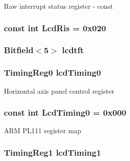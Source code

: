 \label{classPl111_a977905b70318298f359957fea2723d97}
Raw interrupt status register -\/ const \hypertarget{classPl111_a7f3aa652b9a702247d99dee87aee4786}{
\subsubsection[{LcdRis}]{\setlength{\rightskip}{0pt plus 5cm}const int {\bf LcdRis} = 0x020}}
\label{classPl111_a7f3aa652b9a702247d99dee87aee4786}
\hypertarget{classPl111_a5fd2ed83172b7ffc81125a20b85168fe}{
\subsubsection[{lcdtft}]{\setlength{\rightskip}{0pt plus 5cm}Bitfield$<$5$>$ {\bf lcdtft}}}
\label{classPl111_a5fd2ed83172b7ffc81125a20b85168fe}
\hypertarget{classPl111_a913cd36ff92062c47b446b69308ddc56}{
\subsubsection[{lcdTiming0}]{\setlength{\rightskip}{0pt plus 5cm}TimingReg0 {\bf lcdTiming0}}}
\label{classPl111_a913cd36ff92062c47b446b69308ddc56}
Horizontal axis panel control register \hypertarget{classPl111_a3527733d2eb0cefb4a83143afa924755}{
\subsubsection[{LcdTiming0}]{\setlength{\rightskip}{0pt plus 5cm}const int {\bf LcdTiming0} = 0x000}}
\label{classPl111_a3527733d2eb0cefb4a83143afa924755}
ARM PL111 register map \hypertarget{classPl111_a0d40494e71744c6ea4d0f71361a79716}{
\subsubsection[{lcdTiming1}]{\setlength{\rightskip}{0pt plus 5cm}TimingReg1 {\bf lcdTiming1}}}
